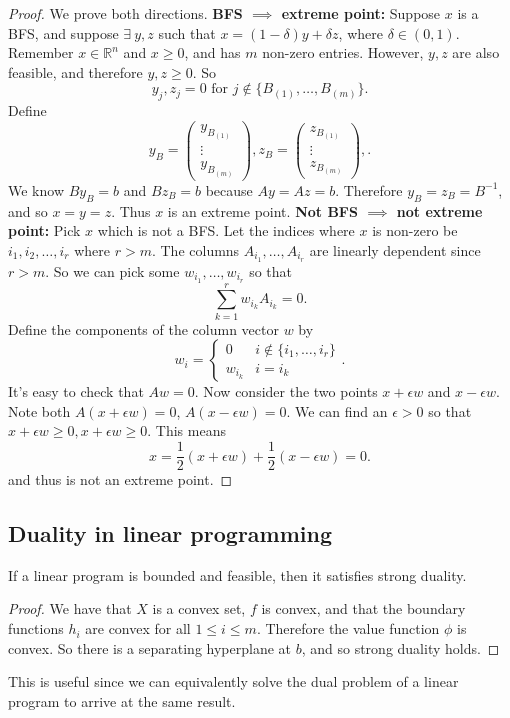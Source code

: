 \documentclass[a4paper]{scrartcl}
\begin{document}
\begin{proof}
	 We prove both directions.\newline 
	 \textbf{BFS $\implies $ extreme point:}\newline 
	 Suppose $x$ is a BFS, and suppose $\exists \ y,z$ such that $x=(1-\delta)y+\delta z$, where $\delta \in (0,1)$. Remember $x \in \mathbb{R}^{n} $ and $x \geq 0$, and has $m$ non-zero entries. However, $y,z$ are also feasible, and therefore $y,z \geq 0$. So 
	 \[y_j,z_j=0 \text{ for } j \notin \{B_{(1)},\ldots ,B_{(m)}\}.\]
	 Define 
	 \[y_B=\begin{pmatrix}
	 y_{B_{(1)}}\\ \vdots \\ y_{B_{(m)}}
	 \end{pmatrix},
	 z_B=\begin{pmatrix}
		z_{B_{(1)}}\\ \vdots \\z_{B_{(m)}} 
		\end{pmatrix},
	 .\]
	 We know $B y_B=b$ and $B z_B=b$ because $Ay=Az=b$. Therefore $y_B=z_B=B^{-1}$, and so $x=y=z$. Thus $x$ is an extreme point.\newline 
	 \textbf{Not BFS $\implies $ not extreme point:}\newline 
	 Pick $x$ which is not a BFS. Let the indices where $x$ is non-zero be $i_1,i_2,\ldots , i_r$ where $r>m$. The columns $A_{i_1},\ldots ,A_{i_r}$ are linearly dependent since $r>m$. So we can pick some $w_{i_1},\ldots ,w_{i_r}$ so that 
	 \[\sum_{k=1}^{r}w_{i_k}A_{i_k}=0.\]
	 Define the components of the column vector $w$ by 
	 \[w_i=\begin{cases}
		 0 & i \notin \{i_1,\ldots , i_r\}\\
		 w_{i_k} & i=i_k
	 \end{cases}
	 .\]
	 It's easy to check that $Aw=0$. Now consider the two points $x+\epsilon w$ and $x- \epsilon w$. Note both $A (x+\epsilon w)=0$, $A (x-\epsilon w)=0$. We can find an $\epsilon>0$ so that $x+\epsilon w \geq 0 , x+\epsilon w \geq 0$. This means 
	 \[x= \frac{1}{2}(x+\epsilon w)+\frac{1}{2}(x-\epsilon w)=0.\]
	 and thus is not an extreme point.
	 
\end{proof}

\subsection{Duality in linear programming}
\begin{theorem}
	 If a linear program is bounded and feasible, then it satisfies strong duality.
\end{theorem}
\begin{proof}
	 We have that $X$ is a convex set, $f$ is convex, and that the boundary functions $h_i$ are convex for all $1 \leq i \leq m$. Therefore the value function $\phi$ is convex. So there is a separating hyperplane at $b$, and so strong duality holds.
\end{proof}
\begin{remark}
	 This is useful since we can equivalently solve the dual problem of a linear program to arrive at the same result.
\end{remark}
\end{document}
